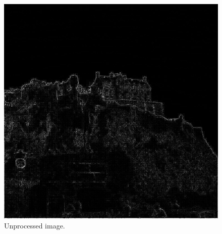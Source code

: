 \documentclass[11pt]{article}
\begin{document}
	\begin{figure}[H]	
		\centering
		\includegraphics[scale=0.23]{edge768x768.jpg}
		\caption{Unprocessed image.}\label{pic0}
	\end{figure}
	
\end{document}
